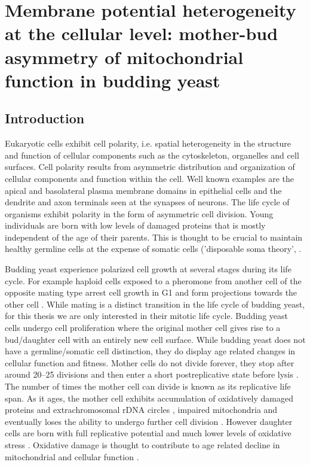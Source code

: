 \chapter[Membrane potential heterogeneity at the cellular level]{Membrane potential heterogeneity at the cellular level: mother-bud asymmetry of mitochondrial function in budding yeast}\label{ch:six}
\clearpage
\section{Introduction}
Eukaryotic cells exhibit cell polarity, i.e. spatial heterogeneity in the structure and function of cellular components such as the cytoskeleton, organelles and cell surfaces. Cell polarity results from asymmetric distribution and organization of cellular components and function within the cell. Well known examples are the apical and basolateral plasma membrane domains in epithelial cells and the dendrite and axon terminals seen at the synapses of neurons. The life cycle of organisms exhibit polarity in the form of asymmetric cell division. Young individuals are born with low levels of damaged proteins that is mostly independent of the age of their parents. This is thought to be crucial to maintain healthy germline cells at the expense of somatic cells ('disposable soma theory', \cite{kirkwood_evolution_1979}.

Budding yeast experience polarized cell growth at several stages during its life cycle. For example haploid cells exposed to a pheromone from another cell of the opposite mating type arrest cell growth in G1 and form projections towards the other cell \cite{madden_cell_1998}. While mating is a distinct transition in the life cycle of budding yeast, for this thesis we are only interested in their mitotic life cycle. Budding yeast cells undergo cell proliferation where the original mother cell gives rise to a bud/daughter cell with an entirely new cell surface. While budding yeast does not have a germline/somatic cell distinction, they do display age related changes in cellular function and fitness. Mother cells do not divide forever, they stop after around 20--25 divisions and then enter a short postreplicative state before lysis \cite{longo_replicative_2012}. The number of times the mother cell can divide is known as its replicative life span. As it ages, the mother cell exhibits accumulation of oxidatively damaged proteins and extrachromosomal rDNA circles \cite{aguilaniu_asymmetric_2003}, impaired mitochondria \cite{lai_mutation_2002} and eventually loses the ability to undergo further cell division \cite{laun_aged_2001}. However daughter cells are born with full replicative potential \cite{steinkraus_replicative_2008} and much lower levels of oxidative stress \cite{aguilaniu_asymmetric_2003}. Oxidative damage is thought to contribute to age related decline in mitochondrial and cellular function \cite{huang_role_2004,lai_mutation_2002}.

